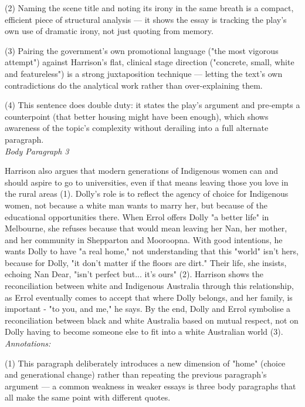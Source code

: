 \documentclass[a4paper]{article}
\begin{document}
(2) Naming the scene title and noting its irony in the same breath is a compact, efficient piece of structural analysis — it shows the essay is tracking the play's own use of dramatic irony, not just quoting from memory.

(3) Pairing the government's own promotional language ("the most vigorous attempt") against Harrison's flat, clinical stage direction ("concrete, small, white and featureless") is a strong juxtaposition technique — letting the text's own contradictions do the analytical work rather than over-explaining them.

(4) This sentence does double duty: it states the play's argument and pre-empts a counterpoint (that better housing might have been enough), which shows awareness of the topic's complexity without derailing into a full alternate paragraph.\\

\textit{Body Paragraph 3}

Harrison also argues that modern generations of Indigenous women can and should aspire to go to universities, even if that means leaving those you love in the rural areas (1). Dolly's role is to reflect the agency of choice for Indigenous women, not because a white man wants to marry her, but because of the educational opportunities there. When Errol offers Dolly "a better life" in Melbourne, she refuses because that would mean leaving her Nan, her mother, and her community in Shepparton and Mooroopna. With good intentions, he wants Dolly to have "a real home," not understanding that this "world" isn't hers, because for Dolly, "it don't matter if the floors are dirt." Their life, she insists, echoing Nan Dear, "isn't perfect but... it's ours" (2). Harrison shows the reconciliation between white and Indigenous Australia through this relationship, as Errol eventually comes to accept that where Dolly belongs, and her family, is important - "to you, and me," he says. By the end, Dolly and Errol symbolise a reconciliation between black and white Australia based on mutual respect, not on Dolly having to become someone else to fit into a white Australian world (3).\\

\textit{Annotations:}

(1) This paragraph deliberately introduces a new dimension of "home" (choice and generational change) rather than repeating the previous paragraph's argument — a common weakness in weaker essays is three body paragraphs that all make the same point with different quotes.
\end{document}
